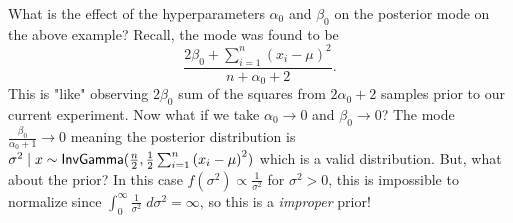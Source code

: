 \begin{exam} \label{exam: bay_norm_3}
    What is the effect of the hyperparameters $\alpha_0$ and $\beta_0$ on the posterior mode on the above example? Recall, the mode was found to be
    \[
        \frac{2 \beta_0 + \sum_{i=1}^{n} \left( x_i - \mu \right)^2}{n + \alpha_0 + 2}.
    \]
    This is "like" observing $2 \beta_0$ sum of the squares from $2 \alpha_0 + 2$ samples prior to our current experiment. Now what if we take $\alpha_0 \to 0$ and $\beta_0 \to 0$? The mode $\frac{\beta_0}{\alpha_0 + 1} \to 0$ meaning the posterior distribution is $\sigma^2 \mid x \sim {\sf InvGamma} (\frac{n}{2} , \frac{1}{2} \sum_{i=1}^{n} \left( x_i - \mu \right)^2)$ which is a valid distribution. But, what about the prior? In this case $f(\sigma^2) \propto \frac{1}{\sigma^2}$ for $\sigma^2 > 0$, this is impossible to normalize since $\int_{0}^{\infty} \frac{1}{\sigma^2} \; d \sigma^2 = \infty$, so this is a {\it improper} prior!
\end{exam}

